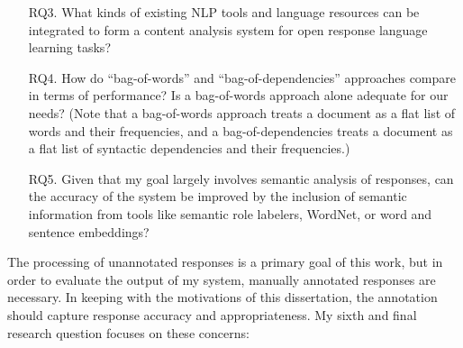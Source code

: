 \begin{itemize}
\item[RQ3.]{What kinds of existing NLP tools and language resources can be integrated to form a content analysis system for open response language learning tasks?}
\end{itemize}

\begin{itemize}
\item[RQ4.]{How do ``bag-of-words'' and ``bag-of-dependencies'' approaches compare in terms of performance? Is a bag-of-words approach alone adequate for our needs? (Note that a bag-of-words approach treats a document as a flat list of words and their frequencies, and a bag-of-dependencies treats a document as a flat list of syntactic dependencies and their frequencies.)}
\end{itemize}

\begin{itemize}
\item[RQ5.]{Given that my goal largely involves semantic analysis of responses, can the accuracy of the system be improved by the inclusion of semantic information from tools like semantic role labelers, WordNet, or word and sentence embeddings?}
\end{itemize}

The processing of unannotated responses is a primary goal of this work, but in order to evaluate the output of my system, manually annotated responses are necessary. In keeping with the motivations of this dissertation, the annotation should capture response accuracy and appropriateness. My sixth and final research question focuses on these concerns:

